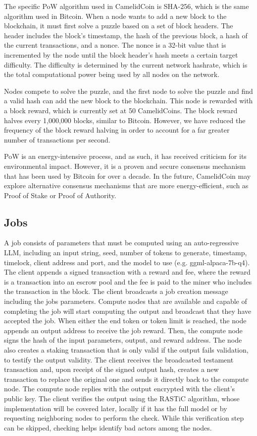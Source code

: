 \documentclass{article}
\begin{document}
The specific PoW algorithm used in CamelidCoin is SHA-256, which is the same algorithm used in Bitcoin. 
When a node wants to add a new block to the blockchain, it must first solve a puzzle based on a set of block headers. 
The header includes the block's timestamp, the hash of the previous block, a hash of the current transactions, and a nonce. 
The nonce is a 32-bit value that is incremented by the node until the block header's hash meets a certain target difficulty. 
The difficulty is determined by the current network hashrate, which is the total computational power being used by all nodes on the network.

Nodes compete to solve the puzzle, and the first node to solve the puzzle and find a valid hash can add the new block to the blockchain. 
This node is rewarded with a block reward, which is currently set at 50 CamelidCoins. The block reward halves every 1,000,000 blocks, similar to Bitcoin.
However, we have reduced the frequency of the block reward halving in order to account for a far greater number of transactions per second.

PoW is an energy-intensive process, and as such, it has received criticism for its environmental impact. 
However, it is a proven and secure consensus mechanism that has been used by Bitcoin for over a decade.
In the future, CamelidCoin may explore alternative consensus mechanisms that are more energy-efficient, such as Proof of Stake or Proof of Authority.

\subsection{Jobs}
A job consists of parameters that must be computed using an auto-regressive LLM, including an input string, seed, number of tokens to generate, timestamp, timelock, client address and port, and the model to use (e.g. ggml-alpaca-7b-q4). 
The client appends a signed transaction with a reward and fee, where the reward is a transaction into an escrow pool and the fee is paid to the miner who includes the transaction in the block. 
The client broadcasts a job creation message including the jobs parameters.
Compute nodes that are available and capable of completing the job will start computing the output and broadcast that they have accepted the job. 
When either the end token or token limit is reached, the node appends an output address to receive the job reward. 
Then, the compute node signs the hash of the input parameters, output, and reward address. 
The node also creates a staking transaction that is only valid if the output fails validation, to testify the output validity. 
The client receives the broadcasted testament transaction and, upon receipt of the signed output hash, creates a new transaction to replace the original one and sends it directly back to the compute node. 
The compute node replies with the output encrypted with the client's public key. 
The client verifies the output using the \ac{RASTiC} algorithm, whose implementation will be covered later, locally if it has the full model or by requesting neighboring nodes to perform the check. 
While this verification step can be skipped, checking helps identify bad actors among the nodes.
\end{document}
